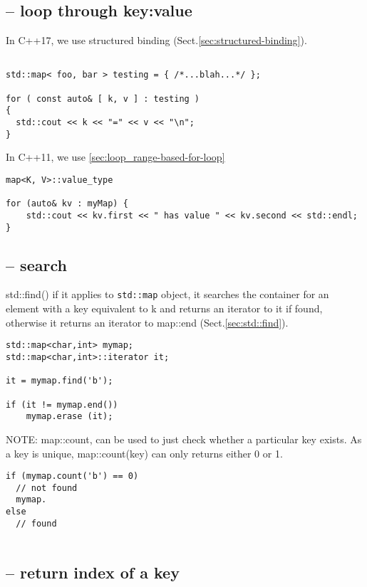 \subsection{-- loop through key:value}

In C++17, we use structured binding (Sect.\ref{sec:structured-binding}).

\begin{lstlisting}

std::map< foo, bar > testing = { /*...blah...*/ };

for ( const auto& [ k, v ] : testing )
{
  std::cout << k << "=" << v << "\n";
}
\end{lstlisting}

In C++11, we use \ref{sec:loop_range-based-for-loop}

\begin{lstlisting}
map<K, V>::value_type

for (auto& kv : myMap) {
    std::cout << kv.first << " has value " << kv.second << std::endl;
}
\end{lstlisting}


\subsection{-- search}

std::find() if it applies to \verb!std::map! object, it searches the container
for an element with a key equivalent to k and returns an iterator to it if
found, otherwise it returns an iterator to map::end (Sect.\ref{sec:std::find}).

\begin{lstlisting}
std::map<char,int> mymap;
std::map<char,int>::iterator it;
  
it = mymap.find('b');

if (it != mymap.end())
    mymap.erase (it);
\end{lstlisting}  


NOTE: map::count, can be used to just check whether a particular key exists.
As a key is unique, map::count(key) can only returns either 0 or 1.
\begin{verbatim}
if (mymap.count('b') == 0)
  // not found
  mymap.
else
  // found
  
\end{verbatim}

\subsection{-- return index of a key}

